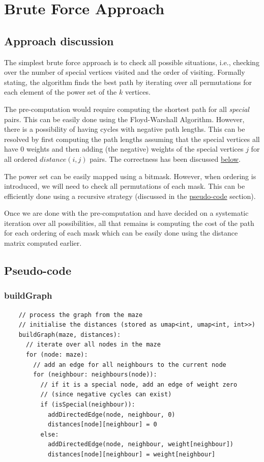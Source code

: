 \documentclass[12pt]{report}
\begin{document}
\chapter{Brute Force Approach}
\section{Approach discussion}
The simplest brute force approach is to check all possible situations, i.e., checking over the number of special vertices visited and the order of visiting. Formally stating, the algorithm finds the best path by iterating over all permutations for each element of the power set of the $k$ vertices.\par
The pre-computation would require computing the shortest path for all \textit{special} pairs. This can be easily done using the Floyd-Warshall Algorithm. However, there is a possibility of having cycles with negative path lengths. This can be resolved by first computing the path lengths assuming that the special vertices all have $0$ weights and then adding (the negative) weights of the special vertices $j$ for all ordered ${distance}(i, j)$ pairs. The correctness has been discussed \hyperref[sec:brute-correctness]{below}.\par
The power set can be easily mapped using a bitmask. However, when ordering is introduced, we will need to check all permutations of each mask. This can be efficiently done using a recursive strategy (discussed in the \hyperref[sec:brute-pseudo]{pseudo-code} section).\par
Once we are done with the pre-computation and have decided on a systematic iteration over all possibilities, all that remains is computing the cost of the path for each ordering of each mask which can be easily done using the distance matrix computed earlier.

\section{Pseudo-code}
\label{sec:brute-pseudo}
\subsection{buildGraph}
\begin{tcolorbox}
\begin{verbatim}
    // process the graph from the maze
    // initialise the distances (stored as umap<int, umap<int, int>>)
    buildGraph(maze, distances):
      // iterate over all nodes in the maze
      for (node: maze):
        // add an edge for all neighbours to the current node
        for (neighbour: neighbours(node)):
          // if it is a special node, add an edge of weight zero
          // (since negative cycles can exist)
          if (isSpecial(neighbour)):
            addDirectedEdge(node, neighbour, 0)
            distances[node][neighbour] = 0
          else:
            addDirectedEdge(node, neighbour, weight[neighbour])
            distances[node][neighbour] = weight[neighbour]
\end{verbatim}
\end{tcolorbox}
\end{document}
